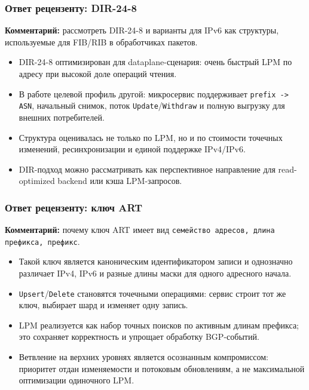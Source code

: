 \begin{frame}\frametitle{Ответ рецензенту: DIR-24-8}
\footnotesize
\textbf{Комментарий:} рассмотреть DIR-24-8 и варианты для IPv6 как структуры,
используемые для FIB/RIB в обработчиках пакетов.

\vspace{0.3em}
\begin{itemize}\setlength{\itemsep}{0.35em}
  \item DIR-24-8 оптимизирован для dataplane-сценария: очень быстрый LPM
  по адресу при высокой доле операций чтения.
  \item В работе целевой профиль другой: микросервис поддерживает
  \texttt{prefix -> ASN}, начальный снимок, поток \texttt{Update}/\texttt{Withdraw}
  и полную выгрузку для внешних потребителей.
  \item Структура оценивалась не только по LPM, но и по стоимости точечных
  изменений, ресинхронизации и единой поддержке IPv4/IPv6.
  \item DIR-подход можно рассматривать как перспективное направление для
  read-optimized backend или кэша LPM-запросов.
\end{itemize}
\end{frame}

\begin{frame}\frametitle{Ответ рецензенту: ключ ART}
\footnotesize
\textbf{Комментарий:} почему ключ ART имеет вид
\texttt{семейство адресов, длина префикса, префикс}.

\vspace{0.3em}
\begin{itemize}\setlength{\itemsep}{0.35em}
  \item Такой ключ является каноническим идентификатором записи и однозначно
  различает IPv4, IPv6 и разные длины маски для одного адресного начала.
  \item \texttt{Upsert}/\texttt{Delete} становятся точечными операциями:
  сервис строит тот же ключ, выбирает шард и изменяет одну запись.
  \item LPM реализуется как набор точных поисков по активным длинам префикса;
  это сохраняет корректность и упрощает обработку BGP-событий.
  \item Ветвление на верхних уровнях является осознанным компромиссом:
  приоритет отдан изменяемости и потоковым обновлениям, а не максимальной
  оптимизации одиночного LPM.
\end{itemize}
\end{frame}

